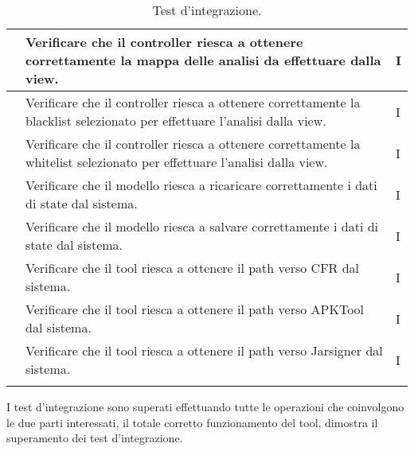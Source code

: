 \begin{longtable}{ |C{3cm} | C{8.5cm}| C{1.5cm} |}
     & Verificare che il controller riesca a ottenere correttamente la mappa delle analisi da effettuare dalla view.              & I \\\hline
     & Verificare che il controller riesca a ottenere correttamente la blacklist selezionato per effettuare l'analisi dalla view. & I \\\hline
     & Verificare che il controller riesca a ottenere correttamente la whitelist selezionato per effettuare l'analisi dalla view. & I \\\hline
     & Verificare che il modello riesca a ricaricare correttamente i dati di state dal sistema.                                   & I \\\hline
     & Verificare che il modello riesca a salvare correttamente i dati di state dal sistema.                                      & I \\\hline
     & Verificare che il tool riesca a ottenere il path verso CFR dal sistema.                                                    & I \\\hline
     & Verificare che il tool riesca a ottenere il path verso APKTool dal sistema.                                                & I \\\hline
     & Verificare che il tool riesca a ottenere il path verso Jarsigner dal sistema.                                              & I \\\hline
    \caption{Test d'integrazione.}
\end{longtable}

I test d'integrazione sono superati effettuando tutte le operazioni che coinvolgono le due parti interessati, il totale corretto funzionamento del tool, dimostra il superamento dei test d'integrazione.
\setcounter{rowcount}{0}

